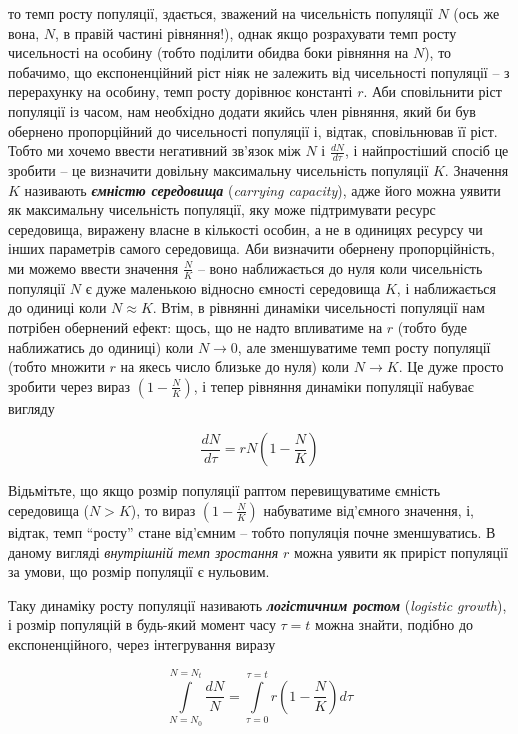 \documentclass[
  11pt,
]{book}
\begin{document}
то темп росту популяції, здається, зважений на чисельність популяції \(N\) (ось же вона, \(N\), в правій частині рівняння!), однак якщо розрахувати темп росту чисельності на особину (тобто поділити обидва боки рівняння на \(N\)), то побачимо, що експоненційний ріст ніяк не залежить від чисельності популяції -- з перерахунку на особину, темп росту дорівнює константі \(r\). Аби сповільнити ріст популяції із часом, нам необхідно додати якийсь член рівняння, який би був обернено пропорційний до чисельності популяції і, відтак, сповільнював її ріст. Тобто ми хочемо ввести негативний зв'язок між \(N\) і \(\frac{dN}{d\tau}\), і найпростіший спосіб це зробити -- це визначити довільну максимальну чисельність популяції \(K\). Значення \(K\) називають \textbf{\emph{ємністю середовища}} (\emph{carrying capacity}), адже його можна уявити як максимальну чисельність популяції, яку може підтримувати ресурс середовища, виражену власне в кількості особин, а не в одиницях ресурсу чи інших параметрів самого середовища. Аби визначити обернену пропорційність, ми можемо ввести значення \(\frac{N}{K}\) -- воно наближається до нуля коли чисельність популяції \(N\) є дуже маленькою відносно ємності середовища \(K\), і наближається до одиниці коли \(N \approx K\). Втім, в рівнянні динаміки чисельності популяції нам потрібен обернений ефект: щось, що не надто впливатиме на \(r\) (тобто буде наближатись до одиниці) коли \(N \rightarrow 0\), але зменшуватиме темп росту популяції (тобто множити \(r\) на якесь число близьке до нуля) коли \(N \rightarrow K\). Це дуже просто зробити через вираз \((1 - \frac{N}{K})\), і тепер рівняння динаміки популяції набуває вигляду

\[\frac{dN}{d\tau} = rN\left(1-\frac{N}{K}\right)\]

Відьмітьте, що якщо розмір популяції раптом перевищуватиме ємність середовища (\(N > K\)), то вираз \((1 - \frac{N}{K})\) набуватиме від'ємного значення, і, відтак, темп ``росту'' стане від'ємним -- тобто популяція почне зменшуватись. В даному вигляді \emph{внутрішній темп зростання} \(r\) можна уявити як приріст популяції за умови, що розмір популяції є нульовим.

Таку динаміку росту популяції називають \textbf{\emph{логістичним ростом}} (\emph{logistic growth}), і розмір популяцій в будь-який момент часу \(\tau = t\) можна знайти, подібно до експоненційного, через інтегрування виразу

\[\int \limits_{N = N_0}^{N=N_t} \frac{dN}{N} = \int \limits_{\tau = 0}^{\tau = t} r \left( 1 - \frac{N}{K}\right)d\tau\]
\end{document}
